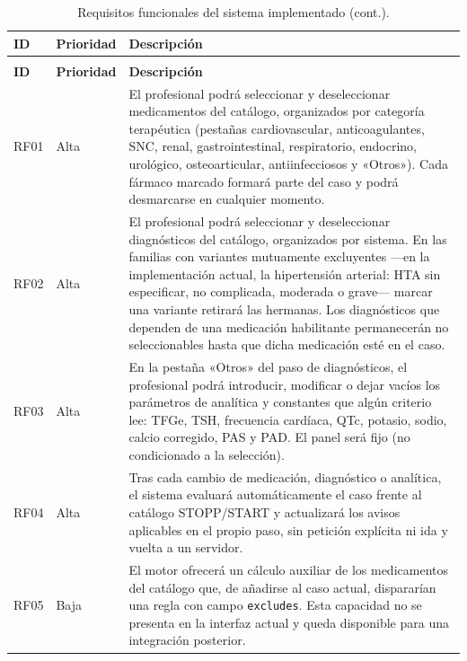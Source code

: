 {\scriptsize
\begin{longtable}{@{}llp{9.2cm}@{}}
  \caption{Requisitos funcionales del sistema implementado.}
  \label{tab:rf} \\
  \toprule
  \textbf{ID} & \textbf{Prioridad} & \textbf{Descripción} \\
  \midrule
  \endfirsthead
  \caption[]{Requisitos funcionales del sistema implementado (cont.).} \\
  \toprule
  \textbf{ID} & \textbf{Prioridad} & \textbf{Descripción} \\
  \midrule
  \endhead
  \bottomrule
  \endfoot
  RF01 & Alta & El profesional podrá seleccionar y deseleccionar medicamentos
    del catálogo, organizados por categoría terapéutica (pestañas
    cardiovascular, anticoagulantes, SNC, renal, gastrointestinal,
    respiratorio, endocrino, urológico, osteoarticular, antiinfecciosos y
    «Otros»). Cada fármaco marcado formará parte del caso y podrá
    desmarcarse en cualquier momento. \\
  RF02 & Alta & El profesional podrá seleccionar y deseleccionar diagnósticos
    del catálogo, organizados por sistema. En las familias con variantes
    mutuamente excluyentes ---en la implementación actual, la hipertensión
    arterial: HTA sin especificar, no complicada, moderada o grave---
    marcar una variante retirará las hermanas. Los diagnósticos que
    dependen de una medicación habilitante permanecerán no seleccionables
    hasta que dicha medicación esté en el caso. \\
  RF03 & Alta & En la pestaña «Otros» del paso de diagnósticos, el profesional
    podrá introducir, modificar o dejar vacíos los parámetros de analítica y
    constantes que algún criterio lee: TFGe, TSH, frecuencia cardíaca, QTc,
    potasio, sodio, calcio corregido, PAS y PAD. El panel será fijo (no
    condicionado a la selección). \\
  RF04 & Alta & Tras cada cambio de medicación, diagnóstico o analítica, el
    sistema evaluará automáticamente el caso frente al catálogo STOPP/START
    y actualizará los avisos aplicables en el propio paso, sin petición
    explícita ni ida y vuelta a un servidor. \\
  RF05 & Baja & El motor ofrecerá un cálculo auxiliar de los medicamentos
    del catálogo que, de añadirse al caso actual, dispararían una regla con
    campo \texttt{excludes}. Esta capacidad no se presenta en la interfaz
    actual y queda disponible para una integración posterior. \\

\end{longtable}}
